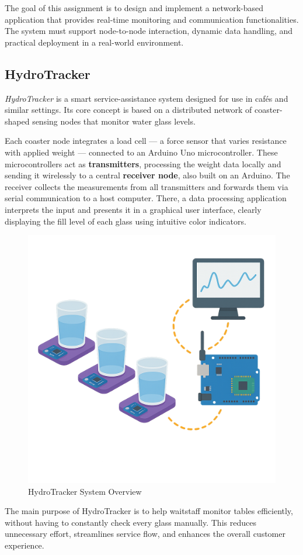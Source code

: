 The goal of this assignment is to design and implement a network-based application that provides real-time monitoring and communication functionalities. The system must support node-to-node interaction, dynamic data handling, and practical deployment in a real-world environment.

\subsection{HydroTracker}

\textit{HydroTracker} is a smart service-assistance system designed for use in cafés and similar settings. Its core concept is based on a distributed network of coaster-shaped sensing nodes that monitor water glass levels.

Each coaster node integrates a load cell — a force sensor that varies resistance with applied weight — connected to an Arduino Uno microcontroller. These microcontrollers act as \textbf{transmitters}, processing the weight data locally and sending it wirelessly to a central \textbf{receiver node}, also built on an Arduino. The receiver collects the measurements from all transmitters and forwards them via serial communication to a host computer. There, a data processing application interprets the input and presents it in a graphical user interface, clearly displaying the fill level of each glass using intuitive color indicators.

\begin{figure}[H]
    \centering
    \includegraphics[width=0.5\linewidth]{assets/system overview.png}
  \caption{HydroTracker System Overview}
  \label{fig:hydrotracker_architecture}
\end{figure}

The main purpose of HydroTracker is to help waitstaff monitor tables efficiently, without having to constantly check every glass manually. This reduces unnecessary effort, streamlines service flow, and enhances the overall customer experience.

